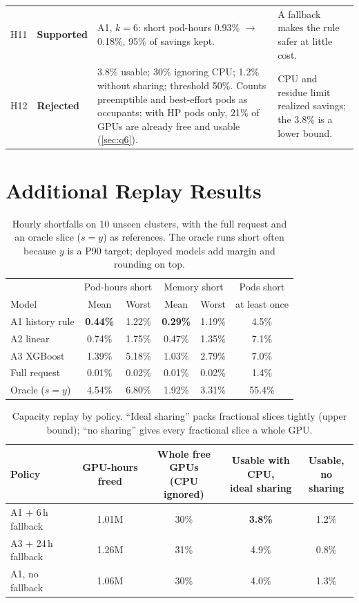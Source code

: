 \documentclass[10pt]{article}
\newcommand{\ra}{$\rightarrow$}
\begin{document}
{\begin{longtable}{@{}P{0.7cm}P{2.3cm}P{6.1cm}P{3.8cm}@{}}
H11 & \textbf{Supported} & A1, $k = 6$: short pod-hours 0.93\% \ra 0.18\%, 95\% of savings kept. & A fallback makes the rule safer at little cost. \\
H12 & \textbf{Rejected} & 3.8\% usable; 30\% ignoring CPU; 1.2\% without sharing; threshold 50\%. Counts preemptible and best-effort pods as occupants; with HP pods only, 21\% of GPUs are already free and usable (\cref{sec:q6}). & CPU and residue limit realized savings; the 3.8\% is a lower bound. \\
\bottomrule
\end{longtable}
}

\section{Additional Replay Results}
\label{app:replay}

\begin{table}[H]
\centering\small
\caption{Hourly shortfalls on 10 unseen clusters, with the full request and an oracle slice ($s = y$) as references. The oracle runs short often because $y$ is a P90 target; deployed models add margin and rounding on top.}
\label{tab:hourly}
\begin{tabular}{@{}lccccc@{}}
\toprule
& \multicolumn{2}{c}{Pod-hours short} & \multicolumn{2}{c}{Memory short} & Pods short \\
\cmidrule(lr){2-3}\cmidrule(lr){4-5}
Model & Mean & Worst & Mean & Worst & at least once \\
\midrule
A1 history rule & \textbf{0.44\%} & 1.22\% & \textbf{0.29\%} & 1.19\% & 4.5\% \\
A2 linear & 0.74\% & 1.75\% & 0.47\% & 1.35\% & 7.1\% \\
A3 XGBoost & 1.39\% & 5.18\% & 1.03\% & 2.79\% & 7.0\% \\
Full request & 0.01\% & 0.02\% & 0.01\% & 0.02\% & 1.4\% \\
Oracle ($s = y$) & 4.54\% & 6.80\% & 1.92\% & 3.31\% & 55.4\% \\
\bottomrule
\end{tabular}
\end{table}

\begin{table}[H]
\centering\small
\caption{Capacity replay by policy. ``Ideal sharing'' packs fractional slices tightly (upper bound); ``no sharing'' gives every fractional slice a whole GPU.}
\label{tab:capacity}
\begin{tabular}{@{}lcccc@{}}
\toprule
Policy & GPU-hours freed & \makecell{Whole free GPUs\\(CPU ignored)} & \makecell{Usable with CPU,\\ideal sharing} & \makecell{Usable,\\no sharing} \\
\midrule
A1 + 6\,h fallback & 1.01M & 30\% & \textbf{3.8\%} & 1.2\% \\
A3 + 24\,h fallback & 1.26M & 31\% & 4.9\% & 0.8\% \\
A1, no fallback & 1.06M & 30\% & 4.0\% & 1.3\% \\
\bottomrule
\end{tabular}
\end{table}
\end{document}

